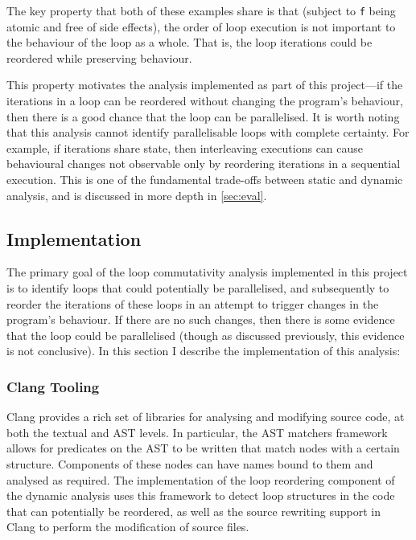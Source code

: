 \documentclass[journal]{IEEEtran}
\begin{document}
The key property that both of these examples share is that (subject to
\texttt{f} being atomic and free of side effects), the order of loop execution
is not important to the behaviour of the loop as a whole. That is, the loop
iterations could be reordered while preserving behaviour.

This property motivates the analysis implemented as part of this
project---if the iterations in a loop can be reordered without changing the
program's behaviour, then there is a good chance that the loop can be
parallelised. It is worth noting that this analysis cannot identify
parallelisable loops with complete certainty. For example, if iterations share
state, then interleaving executions can cause behavioural changes not observable
only by reordering iterations in a sequential execution. This is one of the
fundamental trade-offs between static and dynamic analysis, and is discussed in
more depth in \autoref{sec:eval}.

\subsection{Implementation} \label{ssec:impl}

The primary goal of the loop commutativity analysis implemented in this project
is to identify loops that could potentially be parallelised, and subsequently to
reorder the iterations of these loops in an attempt to trigger changes in the
program's behaviour. If there are no such changes, then there is some evidence
that the loop could be parallelised (though as discussed previously, this
evidence is not conclusive). In this section I describe the implementation of
this analysis:

\subsubsection{Clang Tooling}

Clang provides a rich set of libraries for analysing and modifying source code,
at both the textual and AST levels. In particular, the AST matchers framework
allows for predicates on the AST to be written that match nodes with a certain
structure. Components of these nodes can have names bound to them and analysed
as required. The implementation of the loop reordering component of the dynamic
analysis uses this framework to detect loop structures in the code that can
potentially be reordered, as well as the source rewriting support in Clang to
perform the modification of source files. 
\end{document}
